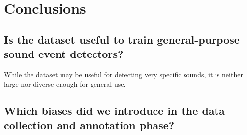 
\section{Conclusions}
\label{sec:Conclusions}


\subsection{Is the dataset useful to train general-purpose sound event detectors?}
\label{sec:Conclusions:a}

While the dataset may be useful for detecting very specific sounds, it is neither large nor diverse enough for general use.


\subsection{Which biases did we introduce in the data collection and annotation phase?}
\label{sec:Conclusions:c}
\lipsum[1][1]

